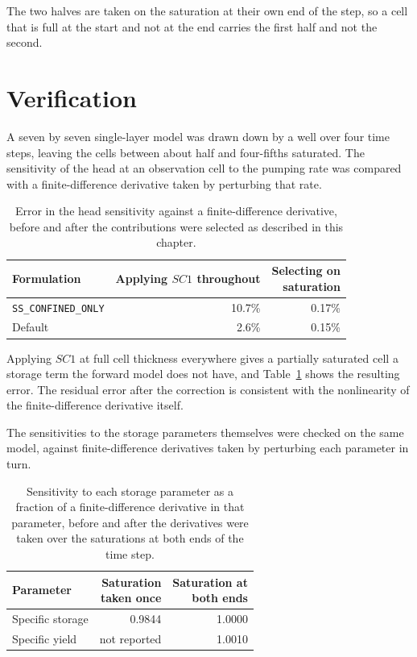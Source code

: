 The two halves are taken on the saturation at their own end of the step, so a cell that is full at the start and not at the end carries the first half and not the second.

\section*{Verification}

A seven by seven single-layer model was drawn down by a well over four time steps, leaving the cells between about half and four-fifths saturated. The sensitivity of the head at an observation cell to the pumping rate was compared with a finite-difference derivative taken by perturbing that rate.

\begin{table}[htb]
	\centering
	\caption{Error in the head sensitivity against a finite-difference
	derivative, before and after the contributions were selected as described
	in this chapter.}
	\label{tab:sto-verify}
	\small
	\begin{tabular}{lrr}
		\toprule
		Formulation &
		\shortstack[r]{Applying $SC1$\\throughout} &
		\shortstack[r]{Selecting on\\saturation} \\
		\midrule
		\texttt{SS\_CONFINED\_ONLY} & 10.7\% & 0.17\% \\
		Default                     & 2.6\%  & 0.15\% \\
		\bottomrule
	\end{tabular}
\end{table}

Applying $SC1$ at full cell thickness everywhere gives a partially saturated cell a storage term the forward model does not have, and Table~\ref{tab:sto-verify} shows the resulting error. The residual error after the correction is consistent with the nonlinearity of the finite-difference derivative itself.

The sensitivities to the storage parameters themselves were checked on the same model, against finite-difference derivatives taken by perturbing each parameter in turn.

\begin{table}[htb]
	\centering
	\caption{Sensitivity to each storage parameter as a fraction of a
	finite-difference derivative in that parameter, before and after the
	derivatives were taken over the saturations at both ends of the time step.}
	\label{tab:sto-parameters}
	\small
	\begin{tabular}{lrr}
		\toprule
		Parameter &
		\shortstack[r]{Saturation\\taken once} &
		\shortstack[r]{Saturation at\\both ends} \\
		\midrule
		Specific storage & 0.9844       & 1.0000 \\
		Specific yield   & not reported & 1.0010 \\
		\bottomrule
	\end{tabular}
\end{table}

